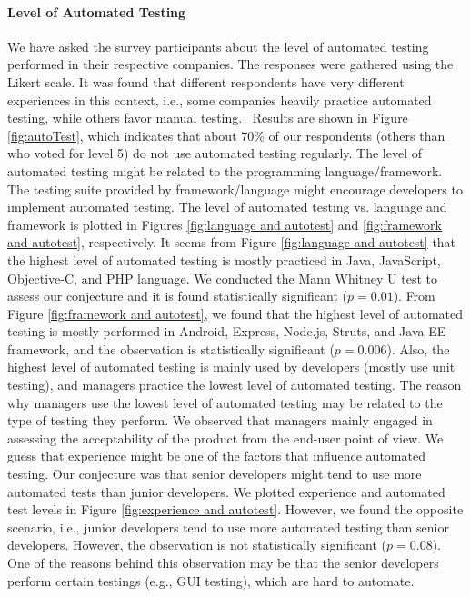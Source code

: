 \paragraph{Level of Automated Testing}
We have asked the survey participants about the level of automated testing performed in their respective companies. The responses were gathered using the Likert scale. It was found that different respondents have very different experiences in this context, i.e., some companies heavily practice automated testing, while others favor manual testing.  Results are shown in Figure \ref{fig:autoTest}, which indicates that about 70\% of our respondents (others than who voted for level 5) do not use automated testing regularly. The level of automated testing might be related to the programming language/framework. The testing suite provided by framework/language might encourage developers to implement automated testing. The level of automated testing vs. language and framework is plotted in Figures \ref{fig:language and autotest} and \ref{fig:framework and autotest}, respectively. It seems from Figure \ref{fig:language and autotest} that the highest level of automated testing is mostly practiced in Java, JavaScript, Objective-C, and PHP language. We conducted the Mann Whitney U test to assess our conjecture and it is found statistically significant ($p=0.01$). From Figure \ref{fig:framework and autotest}, we found that the highest level of automated testing is mostly performed in Android, Express, Node.js, Struts, and Java EE framework, and the observation is statistically significant ($p=0.006$). Also, the highest level of automated testing is mainly used by developers (mostly use unit testing), and managers practice the lowest level of automated testing. The reason why managers use the lowest level of automated testing may be related to the type of testing they perform. We observed that managers mainly engaged in assessing the acceptability of the product from the end-user point of view. We guess that experience might be one of the factors that influence automated testing. Our conjecture was that senior developers might tend to use more automated tests than junior developers. We plotted experience and automated test levels in Figure \ref{fig:experience and autotest}. However, we found the opposite scenario, i.e., junior developers tend to use more automated testing than senior developers. However, the observation is not statistically significant ($p=0.08$). One of the reasons behind this observation may be that the senior developers perform certain testings (e.g., GUI testing), which are hard to automate.

